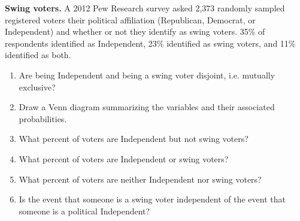 \documentclass[12pt]{article}
\newcommand{\qt}[1]{\textcolor{custom_carnelian}{\textbf{#1.}}}
\begin{document}

{\qt{Swing voters\label{swing_voters}} A 2012 Pew Research survey asked 2,373 
randomly sampled registered voters their political affiliation (Republican, 
Democrat, or Independent) and whether or not they identify as swing voters. 35\% 
of respondents identified as Independent, 23\% identified as swing voters, and 
11\% identified as both.
\begin{enumerate}
\item Are being Independent and being a swing voter disjoint, i.e. mutually 
exclusive?
\vspace{.5cm}
\item Draw a Venn diagram summarizing the variables and their associated 
probabilities.
\vspace{2.5cm}
\item What percent of voters are Independent but not swing voters?
\vspace{.5cm}
\item What percent of voters are Independent or swing voters?
\vspace{.5cm}
\item What percent of voters are neither Independent nor swing voters?
\vspace{.5cm}
\item Is the event that someone is a swing voter independent of the event that 
someone is a political Independent?
\vspace{1cm}
\end{enumerate}
}

\end{document}
